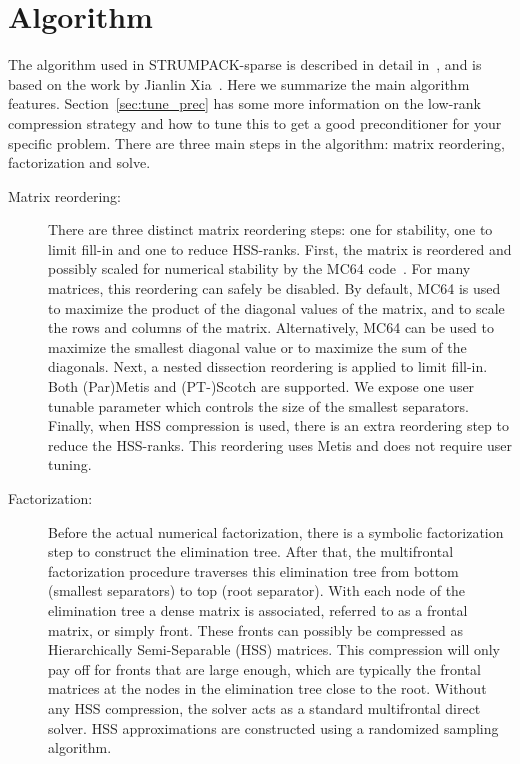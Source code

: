 \documentclass{article}
\begin{document}
\section{Algorithm}\label{sec:algo}
The algorithm used in STRUMPACK-sparse is described in detail
in~\cite{ghysels2015sparse}, and is based on the work by Jianlin
Xia~\cite{xia2013randomized}. Here we summarize the main algorithm
features. Section~\ref{sec:tune_prec} has some more information on the
low-rank compression strategy and how to tune this to get a good
preconditioner for your specific problem. There are three main steps
in the algorithm: matrix reordering, factorization and solve.

\begin{description}
\item[Matrix reordering:] There are three distinct matrix reordering
  steps: one for stability, one to limit fill-in and one to reduce
  HSS-ranks. First, the matrix is reordered and possibly scaled for
  numerical stability by the MC64 code~\cite{duff1999design}. For many
  matrices, this reordering can safely be disabled. By default, MC64
  is used to maximize the product of the diagonal values of the
  matrix, and to scale the rows and columns of the
  matrix. Alternatively, MC64 can be used to maximize the smallest
  diagonal value or to maximize the sum of the diagonals. Next, a
  nested dissection reordering is applied to limit fill-in.  Both
  (Par)Metis and (PT-)Scotch are supported. We expose one user tunable
  parameter which controls the size of the smallest
  separators. Finally, when HSS compression is used, there is an extra
  reordering step to reduce the HSS-ranks. This reordering uses Metis
  and does not require user tuning.

\item[Factorization:] Before the actual numerical factorization, there
  is a symbolic factorization step to construct the elimination
  tree. After that, the multifrontal factorization procedure traverses
  this elimination tree from bottom (smallest separators) to top (root
  separator). With each node of the elimination tree a dense matrix is
  associated, referred to as a frontal matrix, or simply front. These
  fronts can possibly be compressed as Hierarchically Semi-Separable
  (HSS) matrices. This compression will only pay off for fronts that
  are large enough, which are typically the frontal matrices at the
  nodes in the elimination tree close to the root. Without any HSS
  compression, the solver acts as a standard multifrontal direct
  solver. HSS approximations are constructed using a randomized
  sampling algorithm.


\end{description}
\end{document}
